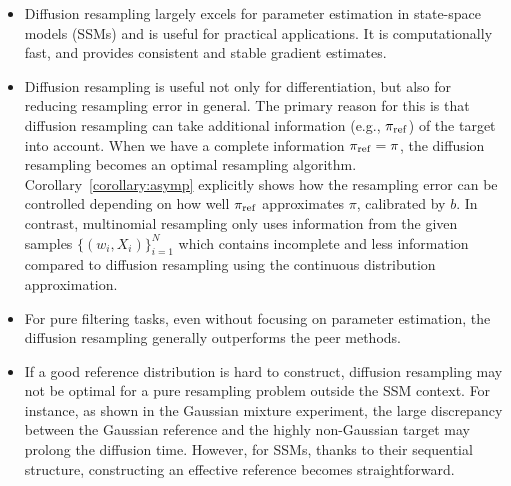\documentclass{article}
\begin{document}
\begin{itemize}
    \item Diffusion resampling largely excels for parameter estimation in state-space models (SSMs) and is useful for practical applications. 
    It is computationally fast, and provides consistent and stable gradient estimates.
    \item Diffusion resampling is useful not only for differentiation, but also for reducing resampling error in general. 
    The primary reason for this is that diffusion resampling can take additional information (e.g., $\pi_{\mathrm{ref}}$) of the target into account. 
    When we have a complete information $\pi_{\mathrm{ref}}=\pi$, the diffusion resampling becomes an optimal resampling algorithm. 
    Corollary~\ref{corollary:asymp} explicitly shows how the resampling error can be controlled depending on how well $\pi_{\mathrm{ref}}$ approximates $\pi$, calibrated by $b$. 
    In contrast, multinomial resampling only uses information from the given samples $\lbrace (w_i, X_i) \rbrace_{i=1}^N$ which contains incomplete and less information compared to diffusion resampling using the continuous distribution approximation.
    \item For pure filtering tasks, even without focusing on parameter estimation, the diffusion resampling generally outperforms the peer methods. 
    \item If a good reference distribution is hard to construct, diffusion resampling may not be optimal for a pure resampling problem outside the SSM context. 
    For instance, as shown in the Gaussian mixture experiment, the large discrepancy between the Gaussian reference and the highly non-Gaussian target may prolong the diffusion time. 
    However, for SSMs, thanks to their sequential structure, constructing an effective reference becomes straightforward. 
\end{itemize}
\end{document}
